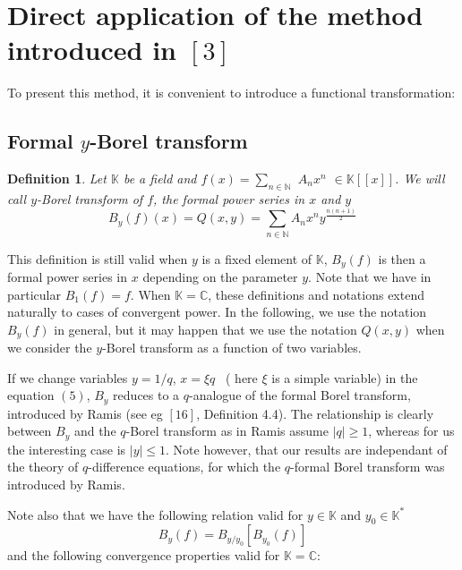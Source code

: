 \documentclass{article}
\newtheorem{definition}{Definition}
\begin{document}
\bigskip\ 

\section{\protect\bigskip Direct application of the method introduced in $\left[ 3\right] $}

\bigskip To present this method, it is convenient to introduce a functional
transformation:

\subsection{Formal $y$-Borel transform}

\begin{definition}
Let $\mathbb{K}$ be a field and $f\left( x\right) =\sum_{n\in \mathbb{N}}$ $A_{n}x^{n}$ $\in \mathbb{K}\left[ \left[ x\right] \right] $. We will call $y$-Borel transform of $f$, the formal power series in $x$ and $y$ 
\begin{equation}
B_{y}\left( f\right) \left( x\right) =Q\left( x,y\right) =\sum\limits_{n\in 
\mathbb{N}}A_{n}x^{n}y^{\tfrac{n\left( n+1\right) }{2}}
\end{equation}
\end{definition}

This definition is still valid when $y$ is a fixed element of $\mathbb{K}$, $B_{y}\left( f\right) $ is then a formal power series in $x$ depending on the
parameter $y$. Note that we have in particular $B_{1}\left( f\right) =f$.
When $\mathbb{K=C}$, these definitions and notations extend naturally to
cases of convergent power. In the following, we use the notation $B_{y}\left( f\right) $ in general, but it may happen that we use the
notation $Q\left( x,y\right) $ when we consider the $y$-Borel transform as a
function of two variables.

If we change variables $y=1/q$, $x=\xi q$ \ ( here $\xi $ is a simple
variable) in the equation $\left( 5\right) $, $B_{y}$ reduces to a $q$-analogue of the formal Borel transform, introduced by Ramis (see eg $\left[
16\right] $, Definition 4.4). The relationship is clearly between $B_{y}$
and the $q$-Borel transform as in Ramis assume $\left| q\right| \geq 1$,
whereas for us the interesting case is $\left| y\right| \leq 1$. Note
however, that our results are independant of the theory of $q$-difference
equations, for which the $q$-formal Borel transform was introduced by Ramis.

Note also that we have the following relation valid for $y\in \mathbb{K}$
and $y_{0}\in \mathbb{K}^{\ast }$ 
\begin{equation}
B_{y}\left( f\right) =B_{y/y_{0}}\left[ B_{y_{0}}\left( f\right) \right]
\end{equation}
and the following convergence properties valid for $\mathbb{K=C}$:
\end{document}
